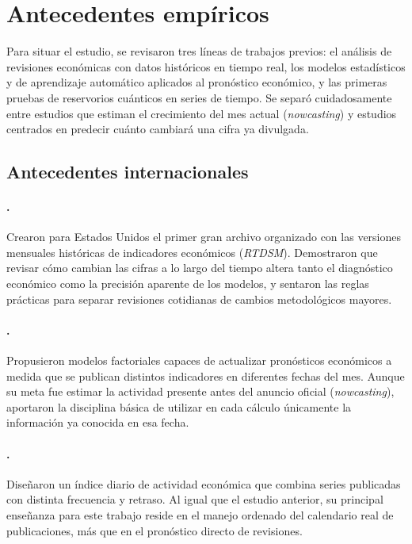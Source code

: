 \section{Antecedentes empíricos}

Para situar el estudio, se revisaron tres líneas de trabajos previos: el análisis de revisiones económicas con datos históricos en tiempo real, los modelos estadísticos y de aprendizaje automático aplicados al pronóstico económico, y las primeras pruebas de reservorios cuánticos en series de tiempo. Se separó cuidadosamente entre estudios que estiman el crecimiento del mes actual (\emph{nowcasting}) y estudios centrados en predecir cuánto cambiará una cifra ya divulgada.

\subsection{Antecedentes internacionales}

\paragraph{\texorpdfstring{\textcite{croushore2001}}{Croushore y Stark (2001)}.}
Crearon para Estados Unidos el primer gran archivo organizado con las versiones mensuales históricas de indicadores económicos (\emph{RTDSM}). Demostraron que revisar cómo cambian las cifras a lo largo del tiempo altera tanto el diagnóstico económico como la precisión aparente de los modelos, y sentaron las reglas prácticas para separar revisiones cotidianas de cambios metodológicos mayores.

\paragraph{\texorpdfstring{\textcite{giannone2008}}{Giannone et al. (2008)}.}
Propusieron modelos factoriales capaces de actualizar pronósticos económicos a medida que se publican distintos indicadores en diferentes fechas del mes. Aunque su meta fue estimar la actividad presente antes del anuncio oficial (\emph{nowcasting}), aportaron la disciplina básica de utilizar en cada cálculo únicamente la información ya conocida en esa fecha.

\paragraph{\texorpdfstring{\textcite{aruoba2009}}{Aruoba et al. (2009)}.}
Diseñaron un índice diario de actividad económica que combina series publicadas con distinta frecuencia y retraso. Al igual que el estudio anterior, su principal enseñanza para este trabajo reside en el manejo ordenado del calendario real de publicaciones, más que en el pronóstico directo de revisiones.


